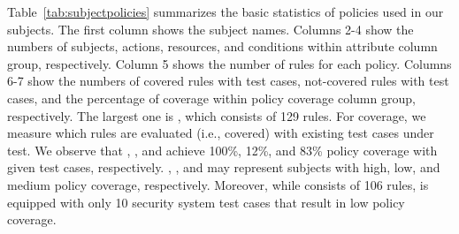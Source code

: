 Table~\ref{tab:subjectpolicies} summarizes the basic statistics of policies used in our subjects.
The first column shows the subject names.
Columns 2-4 show the numbers of subjects, actions, resources, and conditions within attribute column group, respectively.
Column 5 shows the number of rules for each policy.
Columns 6-7 show the numbers of covered rules with test cases, not-covered rules with test cases, and the percentage
of coverage within policy coverage column group, respectively.
The largest one is , which consists of 129 rules.
For coverage, we measure which rules are
evaluated (i.e., covered) with existing test cases under test.
We observe that , , and 
achieve 100\%, 12\%, and 83\% policy coverage with given test cases, respectively. 
, , and  may represent subjects
with high, low, and medium policy coverage, respectively.
Moreover, while  consists of 106 rules,  is equipped with only 10 security system test cases
that result in low policy coverage.









